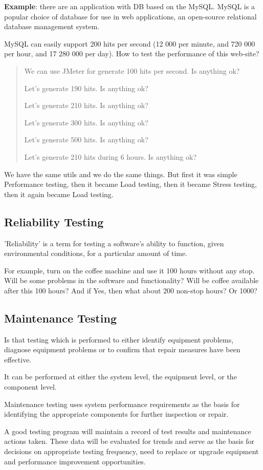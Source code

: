 \textbf{Example}: there are an application with DB based on the MySQL. MySQL is a popular choice of database for use in web applications, an open-source relational database management system.

MySQL can easily support 200 hits per second (12 000 per minute, and 720 000 per hour, and 17 280 000 per day). How to test the performance of this web-site?

\begin{quote}
We can use JMeter for generate 100 hits per second. Is anything ok?

Let's generate 190 hits. Is anything ok?

Let's generate 210 hits. Is anything ok?

Let's generate 300 hits. Is anything ok?

Let's generate 500 hits. Is anything ok?

Let's generate 210 hits during 6 hours. Is anything ok?                                                       \end{quote} 

We have the same utils and we do the same things. But first it was simple Performance testing, then it became Load testing, then it became Stress testing, then it again became Load testing.

\subsection{Reliability Testing}
\label{sec:Reliability Testing}

'Reliability' is a term for testing a software's ability to function, given environmental conditions, for a particular amount of time.

For example, turn on the coffee machine and use it 100 hours without any stop. Will be some problems in the software and functionality? Will be coffee available after this 100 hours? And if Yes, then what about 200 non-stop hours? Or 1000?

\subsection{Maintenance Testing}
\label{sec:Maintenance Testing}

Is that testing which is performed to either identify equipment problems, diagnose equipment problems or to confirm that repair measures have been effective. 

It can be performed at either the system level, the equipment level, or the component level.

Maintenance testing uses system performance requirements as the basis for identifying the appropriate components for further inspection or repair.

A good testing program will maintain a record of test results and maintenance actions taken. These data will be evaluated for trends and serve as the basis for decisions on appropriate testing frequency, need to replace or upgrade equipment and performance improvement opportunities.